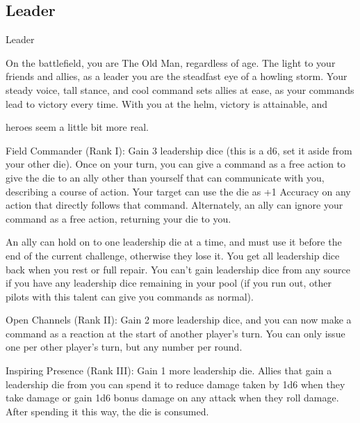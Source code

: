 \subsection{Leader}

                                                    Leader

On the battlefield, you are The Old Man, regardless of age. The light to your friends and allies, as a leader
you are the steadfast eye of a howling storm. Your steady voice, tall stance, and cool command sets allies
at ease, as your commands lead to victory every time. With you at the helm, victory is attainable, and

heroes seem a little bit more real.




Field Commander (Rank I): Gain 3 leadership dice (this is a d6, set it aside from your other die).
Once on your turn, you can give a command as a free action to give the die to an ally other than
yourself that can communicate with you, describing a course of action. Your target can use the
die as +1 Accuracy on any action that directly follows that command. Alternately, an ally can
ignore your command as a free action, returning your die to you.

An ally can hold on to one leadership die at a time, and must use it before the end of the current
challenge, otherwise they lose it. You get all leadership dice back when you rest or full repair. You
can’t gain leadership dice from any source if you have any leadership dice remaining in your pool
(if you run out, other pilots with this talent can give you commands as normal).

Open Channels (Rank II): Gain 2 more leadership dice, and you can now make a command as a
reaction at the start of another player’s turn. You can only issue one per other player’s turn, but
any number per round.

Inspiring Presence (Rank III): Gain 1 more leadership die. Allies that gain a leadership die from
you can spend it to reduce damage taken by 1d6 when they take damage or gain 1d6 bonus
damage on any attack when they roll damage. After spending it this way, the die is consumed.

